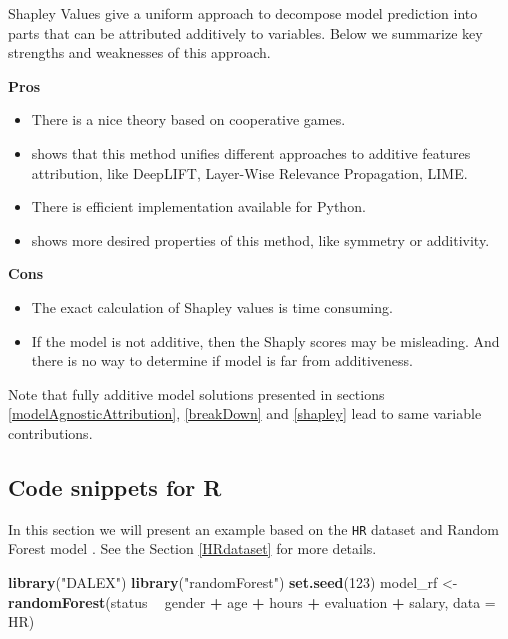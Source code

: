 \documentclass[]{krantz}
\newenvironment{Shaded}{\begin{snugshade}}{\end{snugshade}}
\newcommand{\DataTypeTok}[1]{\textcolor[rgb]{0.13,0.29,0.53}{#1}}
\newcommand{\DecValTok}[1]{\textcolor[rgb]{0.00,0.00,0.81}{#1}}
\newcommand{\KeywordTok}[1]{\textcolor[rgb]{0.13,0.29,0.53}{\textbf{#1}}}
\newcommand{\NormalTok}[1]{#1}
\newcommand{\OperatorTok}[1]{\textcolor[rgb]{0.81,0.36,0.00}{\textbf{#1}}}
\newcommand{\StringTok}[1]{\textcolor[rgb]{0.31,0.60,0.02}{#1}}
\providecommand{\tightlist}{%
  \setlength{\itemsep}{0pt}\setlength{\parskip}{0pt}}
\theoremstyle{definition}
\theoremstyle{definition}
\theoremstyle{definition}
\theoremstyle{remark}
\begin{document}
Shapley Values give a uniform approach to decompose model prediction
into parts that can be attributed additively to variables. Below we
summarize key strengths and weaknesses of this approach.

\textbf{Pros}

\begin{itemize}
\tightlist
\item
  There is a nice theory based on cooperative games.
\item
  \citep{SHAP} shows that this method unifies different approaches to
  additive features attribution, like DeepLIFT, Layer-Wise Relevance
  Propagation, LIME.
\item
  There is efficient implementation available for Python.
\item
  \citep{SHAP} shows more desired properties of this method, like
  symmetry or additivity.
\end{itemize}

\textbf{Cons}

\begin{itemize}
\tightlist
\item
  The exact calculation of Shapley values is time consuming.
\item
  If the model is not additive, then the Shaply scores may be
  misleading. And there is no way to determine if model is far from
  additiveness.
\end{itemize}

Note that fully additive model solutions presented in sections
\ref{modelAgnosticAttribution}, \ref{breakDown} and \ref{shapley} lead
to same variable contributions.

\hypertarget{code-snippets-for-r-3}{%
\subsection{Code snippets for R}\label{code-snippets-for-r-3}}

In this section we will present an example based on the \texttt{HR}
dataset and Random Forest model \citep{R-randomForest}. See the Section
\ref{HRdataset} for more details.

\begin{Shaded}
\begin{Highlighting}[]
\KeywordTok{library}\NormalTok{(}\StringTok{"DALEX"}\NormalTok{)}
\KeywordTok{library}\NormalTok{(}\StringTok{"randomForest"}\NormalTok{)}
\KeywordTok{set.seed}\NormalTok{(}\DecValTok{123}\NormalTok{)}
\NormalTok{model_rf <-}\StringTok{ }\KeywordTok{randomForest}\NormalTok{(status }\OperatorTok{~}\StringTok{ }\NormalTok{gender }\OperatorTok{+}\StringTok{ }\NormalTok{age }\OperatorTok{+}\StringTok{ }\NormalTok{hours }\OperatorTok{+}\StringTok{ }\NormalTok{evaluation }\OperatorTok{+}\StringTok{ }\NormalTok{salary, }\DataTypeTok{data =}\NormalTok{ HR)}
\end{Highlighting}
\end{Shaded}
\end{document}
